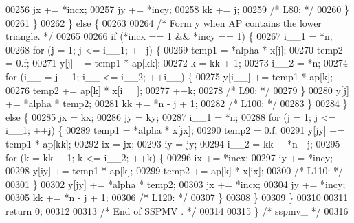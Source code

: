 \begin{DoxyCode}
00256         jx += *incx;
00257         jy += *incy;
00258         kk += j;
00259 \textcolor{comment}{/* L80: */}
00260         \}
00261     \}
00262     \} \textcolor{keywordflow}{else} \{
00263 
00264 \textcolor{comment}{/*        Form  y  when AP contains the lower triangle. */}
00265 
00266     \textcolor{keywordflow}{if} (*incx == 1 && *incy == 1) \{
00267         i\_\_1 = *n;
00268         \textcolor{keywordflow}{for} (j = 1; j <= i\_\_1; ++j) \{
00269         temp1 = *alpha * x[j];
00270         temp2 = 0.f;
00271         y[j] += temp1 * ap[kk];
00272         k = kk + 1;
00273         i\_\_2 = *n;
00274         \textcolor{keywordflow}{for} (i\_\_ = j + 1; i\_\_ <= i\_\_2; ++i\_\_) \{
00275             y[i\_\_] += temp1 * ap[k];
00276             temp2 += ap[k] * x[i\_\_];
00277             ++k;
00278 \textcolor{comment}{/* L90: */}
00279         \}
00280         y[j] += *alpha * temp2;
00281         kk += *n - j + 1;
00282 \textcolor{comment}{/* L100: */}
00283         \}
00284     \} \textcolor{keywordflow}{else} \{
00285         jx = kx;
00286         jy = ky;
00287         i\_\_1 = *n;
00288         \textcolor{keywordflow}{for} (j = 1; j <= i\_\_1; ++j) \{
00289         temp1 = *alpha * x[jx];
00290         temp2 = 0.f;
00291         y[jy] += temp1 * ap[kk];
00292         ix = jx;
00293         iy = jy;
00294         i\_\_2 = kk + *n - j;
00295         \textcolor{keywordflow}{for} (k = kk + 1; k <= i\_\_2; ++k) \{
00296             ix += *incx;
00297             iy += *incy;
00298             y[iy] += temp1 * ap[k];
00299             temp2 += ap[k] * x[ix];
00300 \textcolor{comment}{/* L110: */}
00301         \}
00302         y[jy] += *alpha * temp2;
00303         jx += *incx;
00304         jy += *incy;
00305         kk += *n - j + 1;
00306 \textcolor{comment}{/* L120: */}
00307         \}
00308     \}
00309     \}
00310 
00311     \textcolor{keywordflow}{return} 0;
00312 
00313 \textcolor{comment}{/*     End of SSPMV . */}
00314 
00315 \} \textcolor{comment}{/* sspmv\_ */}
00316 
\end{DoxyCode}

